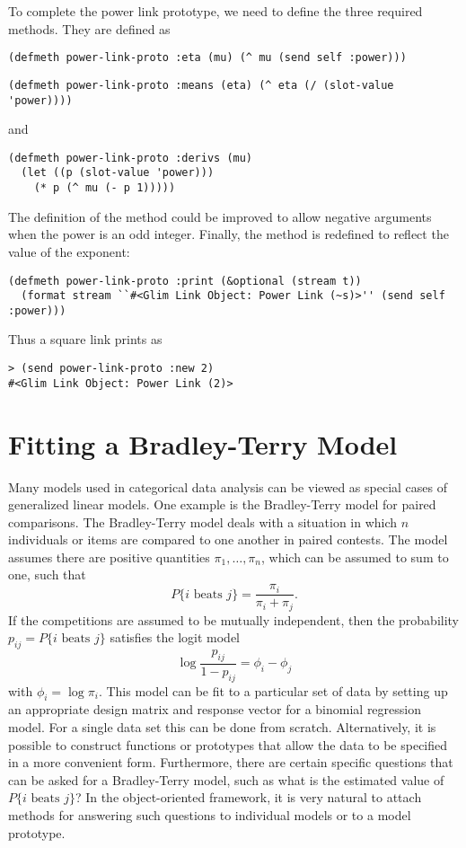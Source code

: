 To complete the power link prototype, we need to define the three
required methods. They are defined as
\begin{verbatim}
(defmeth power-link-proto :eta (mu) (^ mu (send self :power)))
\end{verbatim}
\begin{verbatim}
(defmeth power-link-proto :means (eta) (^ eta (/ (slot-value 'power))))
\end{verbatim}
and
\begin{verbatim}
(defmeth power-link-proto :derivs (mu)
  (let ((p (slot-value 'power)))
    (* p (^ mu (- p 1)))))
\end{verbatim}
The definition of the  method could be improved to allow
negative arguments when the power is an odd integer. Finally, the
 method is redefined to reflect the value of the
exponent:
\begin{verbatim}
(defmeth power-link-proto :print (&optional (stream t))
  (format stream ``#<Glim Link Object: Power Link (~s)>'' (send self :power)))
\end{verbatim}
Thus a square link prints as
\begin{verbatim}
> (send power-link-proto :new 2)
#<Glim Link Object: Power Link (2)>
\end{verbatim}

\section{Fitting a Bradley-Terry Model}
Many models used in categorical data analysis can be viewed as
special cases of generalized linear models. One example is the
Bradley-Terry model for paired comparisons. The Bradley-Terry model
deals with a situation in which $n$ individuals or items are compared
to one another in paired contests.  The model assumes there are
positive quantities $\pi_{1}, \ldots, \pi_{n}$, which can be assumed
to sum to one, such that
\begin{displaymath}
P\{\mbox{$i$ beats $j$}\} = \frac{\pi_{i}}{\pi_{i} + \pi_{j}}.
\end{displaymath}
If the competitions are assumed to be mutually independent, then the
probability $p_{ij} = P\{\mbox{$i$ beats $j$}\}$ satisfies the logit
model
\begin{displaymath}
\log\frac{p_{ij}}{1-p_{ij}} = \phi_{i} - \phi_{j}
\end{displaymath}
with $\phi_{i} = \log \pi_{i}$. This model can be fit to a particular
set of data by setting up an appropriate design matrix and response
vector for a binomial regression model. For a single data set this can
be done from scratch. Alternatively, it is possible to construct
functions or prototypes that allow the data to be specified in a more
convenient form. Furthermore, there are certain specific questions
that can be asked for a Bradley-Terry model, such as what is the
estimated value of $P\{\mbox{$i$ beats $j$}\}$? In the object-oriented
framework, it is very natural to attach methods for answering such
questions to individual models or to a model prototype.

